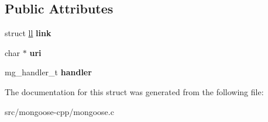 \subsection*{Public Attributes}
\begin{DoxyCompactItemize}
\item 
struct \hyperlink{structll}{ll} {\bfseries link}\hypertarget{structuri__handler_afb959ff18ce145b42990e35b4c9ae2a4}{}\label{structuri__handler_afb959ff18ce145b42990e35b4c9ae2a4}

\item 
char $\ast$ {\bfseries uri}\hypertarget{structuri__handler_af3718fa4e4c1e2f7899a04c62121c048}{}\label{structuri__handler_af3718fa4e4c1e2f7899a04c62121c048}

\item 
mg\+\_\+handler\+\_\+t {\bfseries handler}\hypertarget{structuri__handler_ac0386e16bd930a63def417b55b86c509}{}\label{structuri__handler_ac0386e16bd930a63def417b55b86c509}

\end{DoxyCompactItemize}


The documentation for this struct was generated from the following file\+:\begin{DoxyCompactItemize}
\item 
src/mongoose-\/cpp/mongoose.\+c\end{DoxyCompactItemize}
